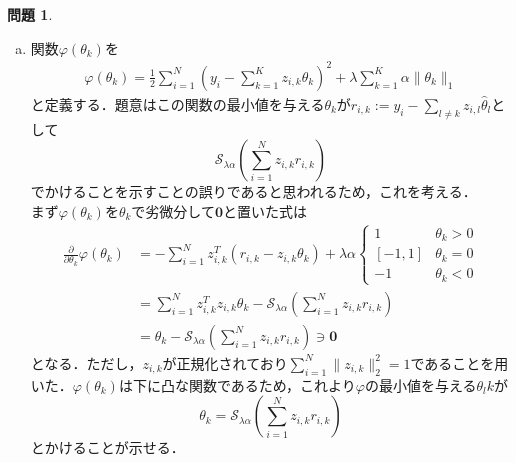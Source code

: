 \documentclass[titlepage]{jsarticle}
\theoremstyle{definition}
\newtheorem{Ex}{問題}
\theoremstyle{mystyle} %
\begin{document}
\begin{Ex}
\begin{enumerate}[(a)]
\item 関数$\varphi(\theta_k)$を
\begin{align*}
\varphi(\theta_k) =\frac{1}{2}\sum_{i=1}^N(y_i - \sum_{k=1}^Kz_{i,k}\theta_k)^2 + \lambda\sum_{k=1}^K \alpha \|\theta_k\|_1
\end{align*}
と定義する．題意はこの関数の最小値を与える$\theta_k$が$r_{i,k} := y_i - \sum_{l\neq k}z_{i,l}\hat{\theta}_l$として
$$\mathcal{S}_{\lambda \alpha}\left(\sum_{i=1}^N z_{i,k}r_{i,k}\right)$$
でかけることを示すことの誤りであると思われるため，これを考える．\\

まず$\varphi(\theta_k)$を$\theta_k$で劣微分して${\bm 0}$と置いた式は
\begin{align*}
\frac{\partial}{\partial \theta_{k}} \varphi(\theta_k)&=-\sum_{i=1}^N z_{i,k}^T(r_{i,k} - z_{i,k}\theta_k)+\lambda \alpha\begin{cases}
1 & \theta_k > 0\\
[-1,1] &\theta_k = 0\\
-1 & \theta_k < 0
\end{cases}\\
&=\sum_{i=1}^N z_{i,k}^T z_{i,k}\theta_k - \mathcal{S}_{\lambda\alpha}\left(\sum_{i=1}^N  z_{i,k} r_{i,k}\right)\\
& = \theta_k - \mathcal{S}_{\lambda\alpha}\left(\sum_{i=1}^N  z_{i,k} r_{i,k}\right) \ni {\bm 0}
\end{align*}
となる．ただし，$z_{i,k}$が正規化されており$\displaystyle\sum_{i = 1}^N \|z_{i,k}\|_2 ^2 = 1$であることを用いた．$\varphi(\theta_k)$は下に凸な関数であるため，これより$\varphi$の最小値を与える$\theta_lk$が
$$\theta_k = \mathcal{S}_{\lambda\alpha}\left(\sum_{i=1}^N  z_{i,k} r_{i,k}\right)$$
とかけることが示せる．\\


\end{enumerate}
\end{Ex}
\end{document}
